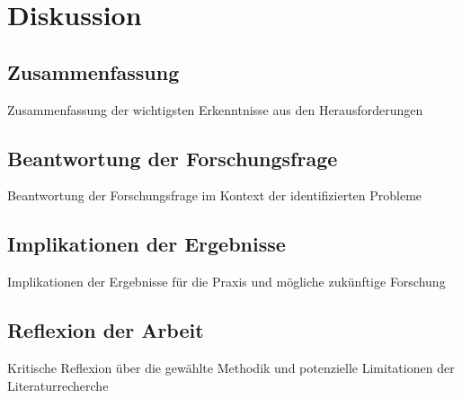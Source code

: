 \section{Diskussion}
\subsection{Zusammenfassung}
Zusammenfassung der wichtigsten Erkenntnisse aus den Herausforderungen
\subsection{Beantwortung der Forschungsfrage}
Beantwortung der Forschungsfrage im Kontext der identifizierten Probleme
\subsection{Implikationen der Ergebnisse}
Implikationen der Ergebnisse für die Praxis und mögliche zukünftige Forschung
\subsection{Reflexion der Arbeit}
Kritische Reflexion über die gewählte Methodik und potenzielle Limitationen der Literaturrecherche